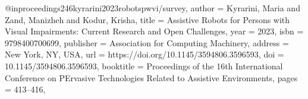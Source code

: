 @inproceedings{246kyrarini2023robotspwvi/survey,
author = {Kyrarini, Maria and Zand, Manizheh and Kodur, Krisha},
title = {Assistive Robots for Persons with Visual Impairments: Current Research and Open Challenges},
year = {2023},
isbn = {9798400700699},
publisher = {Association for Computing Machinery},
address = {New York, NY, USA},
url = {https://doi.org/10.1145/3594806.3596593},
doi = {10.1145/3594806.3596593},
booktitle = {Proceedings of the 16th International Conference on PErvasive Technologies Related to Assistive Environments},
pages = {413–416},
}
